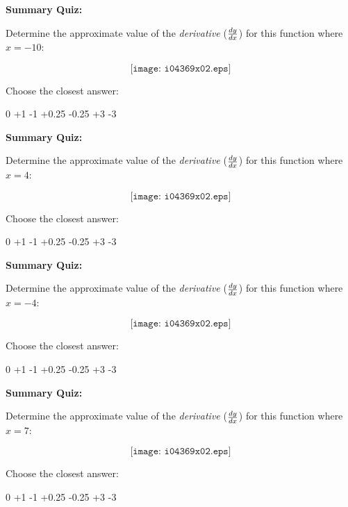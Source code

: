 \vfil \eject

\noindent
{\bf Summary Quiz:}

Determine the approximate value of the {\it derivative} ($dy \over dx$) for this function where $x=-10$:

$$\texttt{[image: i04369x02.eps]}$$

Choose the closest answer:

\vskip 10pt

0 \hskip 40pt +1 \hskip 40pt -1  \hskip 40pt +0.25  \hskip 40pt -0.25  \hskip 40pt +3 \hskip 40pt -3   


\vfil \eject


\noindent
{\bf Summary Quiz:}

Determine the approximate value of the {\it derivative} ($dy \over dx$) for this function where $x=4$:

$$\texttt{[image: i04369x02.eps]}$$

Choose the closest answer:

\vskip 10pt

0 \hskip 40pt +1 \hskip 40pt -1  \hskip 40pt +0.25  \hskip 40pt -0.25  \hskip 40pt +3 \hskip 40pt -3   


\vfil \eject


\noindent
{\bf Summary Quiz:}

Determine the approximate value of the {\it derivative} ($dy \over dx$) for this function where $x=-4$:

$$\texttt{[image: i04369x02.eps]}$$

Choose the closest answer:

\vskip 10pt

0 \hskip 40pt +1 \hskip 40pt -1  \hskip 40pt +0.25  \hskip 40pt -0.25  \hskip 40pt +3 \hskip 40pt -3   

\vfil \eject



\noindent
{\bf Summary Quiz:}

Determine the approximate value of the {\it derivative} ($dy \over dx$) for this function where $x=7$:

$$\texttt{[image: i04369x02.eps]}$$

Choose the closest answer:

\vskip 10pt

0 \hskip 40pt +1 \hskip 40pt -1  \hskip 40pt +0.25  \hskip 40pt -0.25  \hskip 40pt +3 \hskip 40pt -3   






